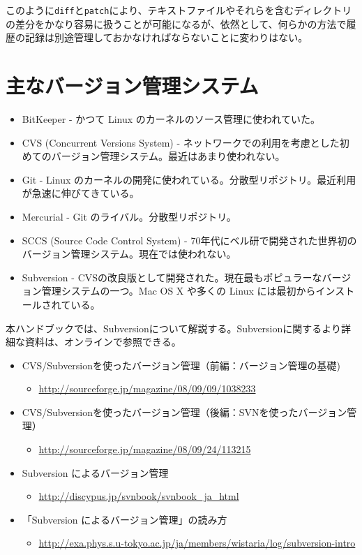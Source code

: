 このように{\tt diff}と{\tt patch}により、テキストファイルやそれらを含むディレクトリの差分をかなり容易に扱うことが可能になるが、依然として、何らかの方法で履歴の記録は別途管理しておかなければならないことに変わりはない。

\section{主なバージョン管理システム}

\begin{itemize}
\item BitKeeper - かつて Linux のカーネルのソース管理に使われていた。
\item CVS (Concurrent Versions System) - ネットワークでの利用を考慮とした初めてのバージョン管理システム。最近はあまり使われない。
\item Git - Linux のカーネルの開発に使われている。分散型リポジトリ。最近利用が急速に伸びてきている。
\item Mercurial - Git のライバル。分散型リポジトリ。
\item SCCS (Source Code Control System) - 70年代にベル研で開発された世界初のバージョン管理システム。現在では使われない。
\item Subversion - CVSの改良版として開発された。現在最もポピュラーなバージョン管理システムの一つ。Mac OS X や多くの Linux には最初からインストールされている。
\end{itemize}
本ハンドブックでは、Subversionについて解説する。Subversionに関するより詳細な資料は、オンラインで参照できる。
\begin{itemize}
\item CVS/Subversionを使ったバージョン管理（前編：バージョン管理の基礎)
  \begin{itemize}
  \item \url{http://sourceforge.jp/magazine/08/09/09/1038233}
  \end{itemize}
\item CVS/Subversionを使ったバージョン管理（後編：SVNを使ったバージョン管理）
  \begin{itemize}
  \item \url{http://sourceforge.jp/magazine/08/09/24/113215}
  \end{itemize}
\item Subversion によるバージョン管理
  \begin{itemize}
  \item \url{http://discypus.jp/svnbook/svnbook_ja_html}
  \end{itemize}
\item 「Subversion によるバージョン管理」の読み方
  \begin{itemize}
  \item \url{http://exa.phys.s.u-tokyo.ac.jp/ja/members/wistaria/log/subversion-intro}
  \end{itemize}
\end{itemize}
